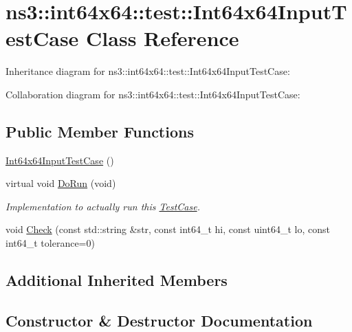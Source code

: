 \hypertarget{classns3_1_1int64x64_1_1test_1_1Int64x64InputTestCase}{}\section{ns3\+:\+:int64x64\+:\+:test\+:\+:Int64x64\+Input\+Test\+Case Class Reference}
\label{classns3_1_1int64x64_1_1test_1_1Int64x64InputTestCase}


Inheritance diagram for ns3\+:\+:int64x64\+:\+:test\+:\+:Int64x64\+Input\+Test\+Case\+:


Collaboration diagram for ns3\+:\+:int64x64\+:\+:test\+:\+:Int64x64\+Input\+Test\+Case\+:
\subsection*{Public Member Functions}
\begin{DoxyCompactItemize}
\item 
\hyperlink{classns3_1_1int64x64_1_1test_1_1Int64x64InputTestCase_a89f2cc52ec7d111dbe689c2e10bc4671}{Int64x64\+Input\+Test\+Case} ()
\item 
virtual void \hyperlink{classns3_1_1int64x64_1_1test_1_1Int64x64InputTestCase_a8f787a9fb69c16f27547e00521fd541c}{Do\+Run} (void)
\begin{DoxyCompactList}\small\item\em Implementation to actually run this \hyperlink{classns3_1_1TestCase}{Test\+Case}. \end{DoxyCompactList}\item 
void \hyperlink{classns3_1_1int64x64_1_1test_1_1Int64x64InputTestCase_ae31646824694557747bd32f1a0e9b818}{Check} (const std\+::string \&str, const int64\+\_\+t hi, const uint64\+\_\+t lo, const int64\+\_\+t tolerance=0)
\end{DoxyCompactItemize}
\subsection*{Additional Inherited Members}


\subsection{Constructor \& Destructor Documentation}
